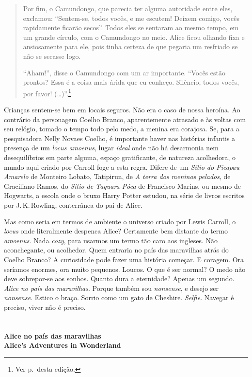 \begin{quote}
Por fim, o Camundongo, que parecia ter alguma autoridade entre eles,
exclamou: ``Sentem-se, todos vocês, e me escutem! Deixem comigo, vocês
rapidamente ficarão secos''. Todos eles se sentaram ao mesmo tempo, em
um grande círculo, com o Camundongo no meio. Alice ficou olhando fixa e
ansiosamente para ele, pois tinha certeza de que pegaria um resfriado se
não se secasse logo.

``Aham!'', disse o Camundongo com um ar importante. ``Vocês estão
prontos? Essa é a coisa mais árida que eu conheço. Silêncio, todos
vocês, por favor! (\ldots)''.\footnote{Ver p.\,\pageref{ref4} desta edição.}
\end{quote}

Crianças sentem-se bem em locais seguros. Não era o caso de nossa
heroína. Ao contrário da personagem Coelho Branco, aparentemente
atrasado e às voltas com seu relógio, tomado o tempo todo pelo medo, a
menina era corajosa. Se, para a pesquisadora Nelly Novaes Coelho, é
importante haver nas histórias infantis a presença de um \emph{locus
amoenus}, lugar \emph{ideal} onde não há desarmonia nem desequilíbrios
em parte alguma, espaço gratificante, de natureza acolhedora, o mundo
aqui criado por Carroll foge a esta regra. Difere de um \emph{Sítio do
Picapau Amarelo} de Monteiro Lobato, Tatipirun, de \emph{A terra dos
meninos pelados}, de Graciliano Ramos, do \emph{Sítio de Taquara-Póca}
de Francisco Marins, ou mesmo de Hogwarts, a escola onde o bruxo Harry
Potter estudou, na série de livros escritos por J.\,K.\,Rowling,
conterrânea do pai de Alice.

Mas como seria em termos de ambiente o universo criado por Lewis
Carroll, o \emph{locus} onde literalmente despenca Alice? Certamente bem
distante do termo \emph{amoenus}. Nada \emph{cozy}, para usarmos um
termo tão caro aos ingleses. Não aconchegante, ou acolhedor. Quem
entraria no país das maravilhas atrás do Coelho Branco? A curiosidade
pode fazer uma história começar. E coragem. Ora seríamos enormes, ora
muito pequenos. Loucos. O que é ser normal? O medo não deve sobrepor-se
aos sonhos. Quanto dura a eternidade? Apenas um segundo. \emph{Alice no
país das maravilhas}. Porque também sou \emph{nonsense}, e desejo ser
\emph{nonsense}. Estico o braço. Sorrio como um gato de Cheshire.
\emph{Selfie}. Navegar é preciso, viver não é preciso.



\pagebreak
\thispagestyle{empty}
\movetooddpage
\chapter*{}
\begin{center}
\begin{vplace}[0.3]
\thispagestyle{empty}
\huge\formular\bfseries
Alice no país das maravilhas\\\bigskip
Alice's Adventures in Wonderland
\end{vplace}
\end{center}
\thispagestyle{empty}
